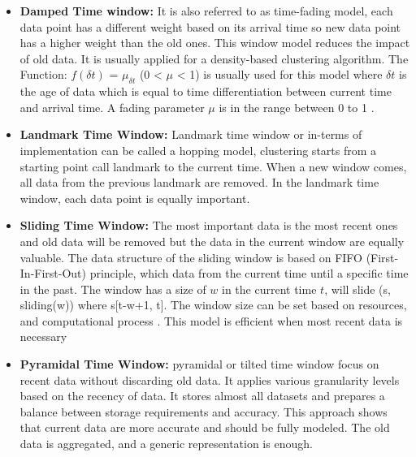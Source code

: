 \documentclass[../UNBThesis2.tex]{subfiles}
\begin{document}
\begin{itemize}

    \item\textbf{Damped Time window:} It is also referred to as time-fading model, each data point has a different weight based on its arrival time so new data point has a higher weight than the old ones. This window model reduces the impact of old data. It is usually applied for a density-based clustering algorithm. The Function: $f(\delta t)$ = $\mu_{\delta t}$ (0 < $\mu$ < 1) is usually used for this model where $\delta t$ is the age of data which is equal to time differentiation between current time and arrival time. A fading parameter $\mu$ is in the range between 0 to 1 \cite{nguyen2015survey}. 
    
    
    \item\textbf{Landmark Time Window:} Landmark time window or in-terms of implementation can be called a hopping model, clustering starts from a starting point call landmark to the current time. When a new window comes, all data from the previous landmark are removed. In the landmark time window, each data point is equally important.


    
    \item\textbf{Sliding Time Window: } The most important data is the most recent ones and old data will be removed but the data in the current window are equally valuable. The data structure of the sliding window is based on FIFO (First-In-First-Out) principle, which data from the current time until a specific time in the past. The window has a size of $w$ in the current time $t$, will slide (s, sliding(w)) where s[t-w+1, t].
    The window size can be set based on resources, and computational process \cite{silva2013data}. This model is efficient when most recent data is necessary \cite{mansalis2018evaluation}  
    
    \item\textbf{Pyramidal Time Window: } pyramidal or tilted time window focus on recent data without discarding old data. It applies various granularity levels based on the recency of data\cite{aggarwal2003framework, nguyen2015survey}. It stores almost all datasets and prepares a balance between storage requirements and accuracy. This approach shows that current data are more accurate and should be fully modeled. The old data is aggregated, and a generic representation is enough.
    
\end{itemize}    
\end{document}
